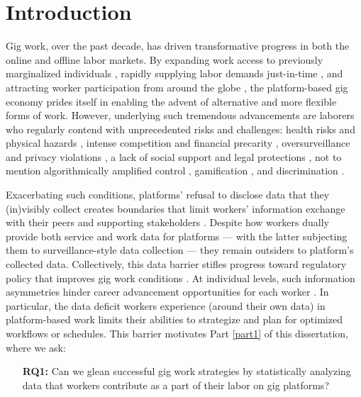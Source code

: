 \chapter{Introduction}\label{ch:introduction}
Gig work, over the past decade, has driven transformative progress in both the online and offline labor markets. 
By expanding work access to previously marginalized individuals \cite{moving, disability}, rapidly supplying labor demands just-in-time \cite{jit, making}, and attracting worker participation from around the globe \cite{woborders}, the platform-based gig economy prides itself in enabling the advent of alternative and more flexible forms of work. 
However, underlying such tremendous advancements are laborers who regularly contend with unprecedented risks and challenges: health risks and physical hazards \cite{body, healthdrive, technostress, jbho}, intense competition and financial precarity \cite{dark, precarity, france, km}, oversurveillance and privacy violations \cite{surveillance, privacy}, a lack of social support and legal protections \cite{atom, category, employment}, not to mention algorithmically amplified control \cite{locus, good}, gamification \cite{game, ludification}, and discrimination \cite{Leung2020-rk, Gelles-Watnick2021-fz, Rosenblat2017-bm}.

Exacerbating such conditions, platforms' refusal to disclose data that they (in)visibly collect creates boundaries that limit workers' information exchange with their peers and supporting stakeholders \cite{zhang24demystifying, peersupport}. 
Despite how workers dually provide both service and work data for platforms --- with the latter subjecting them to surveillance-style data collection \cite{dual} --- they remain outsiders to platform's collected data. 
Collectively, this data barrier stifles progress toward regulatory policy that improves gig work conditions \cite{regulating}. At individual levels, such information asymmetries hinder career advancement opportunities for each worker \cite{own}. 
In particular, the data deficit workers experience (around their own data) in platform-based work limits their abilities to strategize and plan for optimized workflows or schedules. This barrier motivates Part \ref{part1} of this dissertation, where we ask:

\begin{enumerate}
    \item[\textbf{RQ1:}] Can we glean successful gig work strategies by statistically analyzing data that workers contribute as a part of their labor on gig platforms? \cite{personal} 
\end{enumerate}

